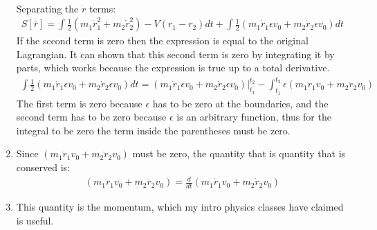 \documentclass[12pt]{article}
\newcommand{\der}[2]{\frac{d #1}{d #2}}
\begin{document}
\begin{enumerate}
\begin{gather}
        \end{gather}
        Separating the $\dot{r}$ terms:
        \begin{gather}
            S[\bar{r}]=\int \frac{1}{2}\left(m_1 \dot{r}_1^2+m_2 \dot{r}_2^2\right)-V(r_1-r_2)dt+\int \frac{1}{2}\left(m_1 \dot{r}_1\epsilon v_0+m_2 \dot{r}_2\epsilon v_0\right)dt
        \end{gather}
        If the second term is zero then the expression is equal to the original Lagrangian.
        It can shown that this second term is zero by integrating it by parts, which works because the expression is true up to a total derivative.
        \begin{gather}
            \int \frac{1}{2}\left(m_1 \dot{r}_1\epsilon v_0+m_2 \dot{r}_2\epsilon v_0\right)dt=\left.\left(m_1 \dot{r}_1\epsilon v_0+m_2 \dot{r}_2\epsilon v_0\right)\right|_{t_1}^{t_2}-\int_{t_1}^{t_2}\epsilon\left(m_1 \ddot{r}_1 v_0+m_2 \ddot{r}_2 v_0\right)
        \end{gather}
        The first term is zero because $\epsilon$ has to be zero at the boundaries, and the second term has to be zero because $\epsilon$ is an arbitrary function, thus for the integral to be zero the term inside the parentheses must be zero.
        \item Since $\left(m_1 \ddot{r}_1 v_0+m_2 \ddot{r}_2 v_0\right)$ must be zero, the quantity that is quantity that is conserved is:
        \begin{gather}
            \left(m_1 \ddot{r}_1 v_0+m_2 \ddot{r}_2 v_0\right)=\der{}{t}\left(m_1 \dot{r}_1 v_0+m_2 \dot{r}_2 v_0\right)
        \end{gather}
        \item This quantity is the momentum, which my intro physics classes have claimed is useful.
    \end{enumerate}
\end{document}
